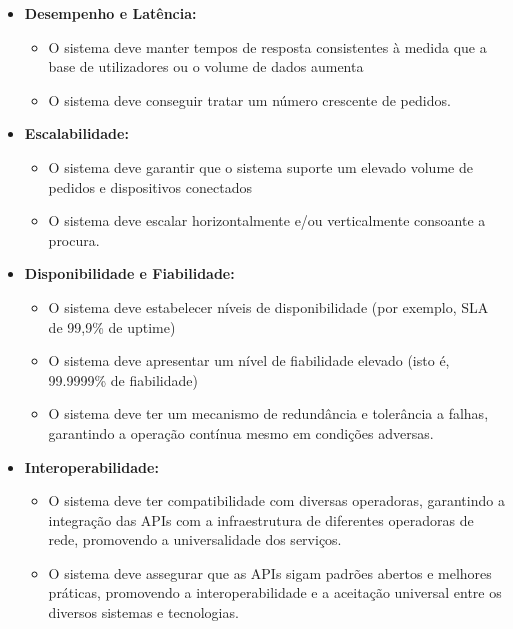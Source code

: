 \begin{itemize}
  \item \textbf{Desempenho e Latência:}
    \begin{itemize}
      \item O sistema deve manter tempos de resposta consistentes à medida que a base de utilizadores ou o volume de dados aumenta 
      \item O sistema deve conseguir tratar um número crescente de pedidos.
    \end{itemize}

  \item \textbf{Escalabilidade:}
    \begin{itemize}
      \item O sistema deve garantir que o sistema suporte um elevado volume de pedidos e dispositivos conectados
      \item O sistema deve escalar horizontalmente e/ou verticalmente consoante a procura.
    \end{itemize}

  \item \textbf{Disponibilidade e Fiabilidade:}
    \begin{itemize} 
      \item O sistema deve estabelecer níveis de disponibilidade (por exemplo, SLA de 99,9\% de uptime) 
      \item O sistema deve apresentar um nível de fiabilidade elevado (isto é, 99.9999\% de fiabilidade)
      \item O sistema deve ter um mecanismo de redundância e tolerância a falhas, garantindo a operação contínua mesmo em condições adversas.
    \end{itemize}
  \item  \textbf{Interoperabilidade:}
    \begin{itemize}
      \item O sistema deve ter compatibilidade com diversas operadoras, garantindo a integração das APIs com a infraestrutura de diferentes operadoras de rede, promovendo a universalidade dos serviços.
      \item O sistema deve assegurar que as APIs sigam padrões abertos e melhores práticas, promovendo a interoperabilidade e a aceitação universal entre os diversos sistemas e tecnologias.
    \end{itemize}



\end{itemize}

